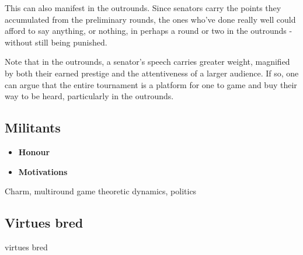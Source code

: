 This can also manifest in the outrounds. Since senators carry the points they accumulated from the preliminary rounds, the ones who've done really well could afford to say anything, or nothing, in perhaps a round or two in the outrounds - without still being punished. 

Note that in the outrounds, a senator’s speech carries greater weight, magnified by both their earned prestige and the attentiveness of a larger audience. If so, one can argue that the entire tournament is a platform for one to game and buy their way to be heard, particularly in the outrounds.













\subsection{Militants}




\begin{itemize}
    \item \textbf{Honour}
    \item \textbf{Motivations}
\end{itemize}


Charm, multiround game theoretic dynamics, politics 


\subsection{Virtues bred}
virtues bred 






